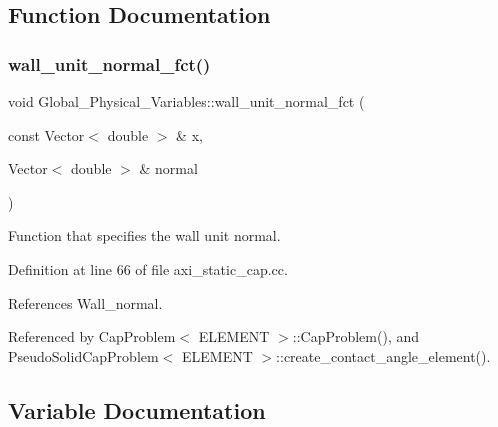 \subsection{Function Documentation}
\mbox{\label{namespaceGlobal__Physical__Variables_a0d48e8726fa485de2b2df2d5031ec41b}} 
\subsubsection{\texorpdfstring{wall\+\_\+unit\+\_\+normal\+\_\+fct()}{wall\_unit\_normal\_fct()}}
{\footnotesize\ttfamily void Global\+\_\+\+Physical\+\_\+\+Variables\+::wall\+\_\+unit\+\_\+normal\+\_\+fct (\begin{DoxyParamCaption}\item[{const Vector$<$ double $>$ \&}]{x,  }\item[{Vector$<$ double $>$ \&}]{normal }\end{DoxyParamCaption})}



Function that specifies the wall unit normal. 



Definition at line 66 of file axi\+\_\+static\+\_\+cap.\+cc.



References Wall\+\_\+normal.



Referenced by Cap\+Problem$<$ E\+L\+E\+M\+E\+N\+T $>$\+::\+Cap\+Problem(), and Pseudo\+Solid\+Cap\+Problem$<$ E\+L\+E\+M\+E\+N\+T $>$\+::create\+\_\+contact\+\_\+angle\+\_\+element().



\subsection{Variable Documentation}
\mbox{\label{namespaceGlobal__Physical__Variables_a3962c36313826b19f216f6bbbdd6a477}} 
